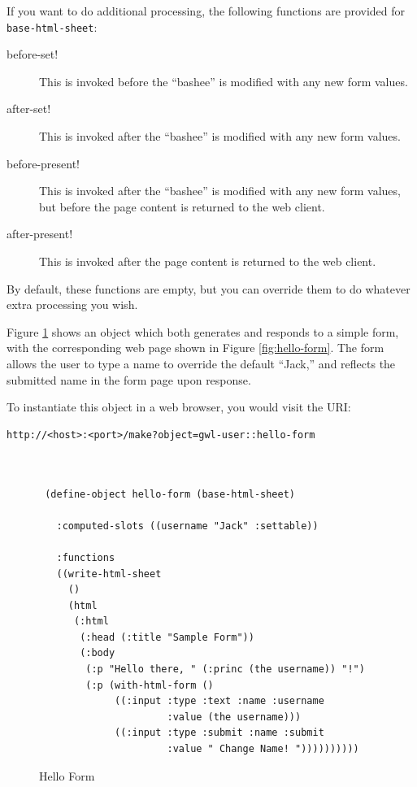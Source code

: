 \documentclass [11pt]{book}
\begin{document}
If you want to do additional processing, the following functions are provided
for \texttt{base-html-sheet}:

\begin{description}

\item [before-set!]
This is invoked before the ``bashee'' is modified with any new form values.

\item [after-set!]
This is invoked after the ``bashee'' is modified with any new form values.

\item [before-present!]
This is invoked after the ``bashee'' is modified with any new form values, but 
before the page content is returned to the web client.

\item [after-present!]
This is invoked after the page content is returned to the web client.

\end{description}

 By default, these functions are empty, but you can override them to do whatever 
extra processing you wish.

Figure 
\ref{code:hello-form} shows an object which both generates and responds to a simple form,
with the corresponding web page shown in Figure 
\ref{fig:hello-form}. The form allows the user to type a name to override the default ``Jack,'' and 
reflects the submitted name in the form page upon response.

To instantiate this object in a web browser, you would visit the URI:

\begin{verbatim}http://<host>:<port>/make?object=gwl-user::hello-form
\end{verbatim}
\begin{figure}
\begin{lrbox}{\boxedverb}
\begin{minipage}{\linewidth}

\begin{verbatim}


 (define-object hello-form (base-html-sheet)

   :computed-slots ((username "Jack" :settable))

   :functions
   ((write-html-sheet 
     ()
     (html
      (:html 
       (:head (:title "Sample Form"))
       (:body 
        (:p "Hello there, " (:princ (the username)) "!")
        (:p (with-html-form ()
             ((:input :type :text :name :username 
                      :value (the username)))
             ((:input :type :submit :name :submit 
                      :value " Change Name! "))))))))))

\end{verbatim}
\end{minipage}
\end{lrbox}
\fbox{\usebox{\boxedverb}}

\caption{Hello Form}

\label{code:hello-form}

\end{figure}
\end{document}
